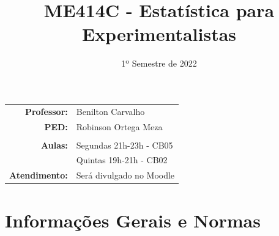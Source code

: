 \documentclass[paper=letter, fontsize=12pt]{scrartcl} %
\title{\normalfont \LARGE ME414C - Estatística para Experimentalistas}
\subtitle{1º Semestre de 2022}
\author{}
\date{}
\begin{document}
\maketitle

\vspace{-1.5cm}

\noindent
\begin{tabular}{rl}
\textbf{Professor:} & 	 Benilton Carvalho \\
\textbf{PED:} 	    & Robinson Ortega Meza \\
\\
\textbf{Aulas:} & Segundas 21h-23h - CB05\\
                & Quintas 19h-21h - CB02 \\
\textbf{Atendimento:} & Será divulgado no Moodle\\



\end{tabular}

\section{Informações Gerais e Normas}
\end{document}

